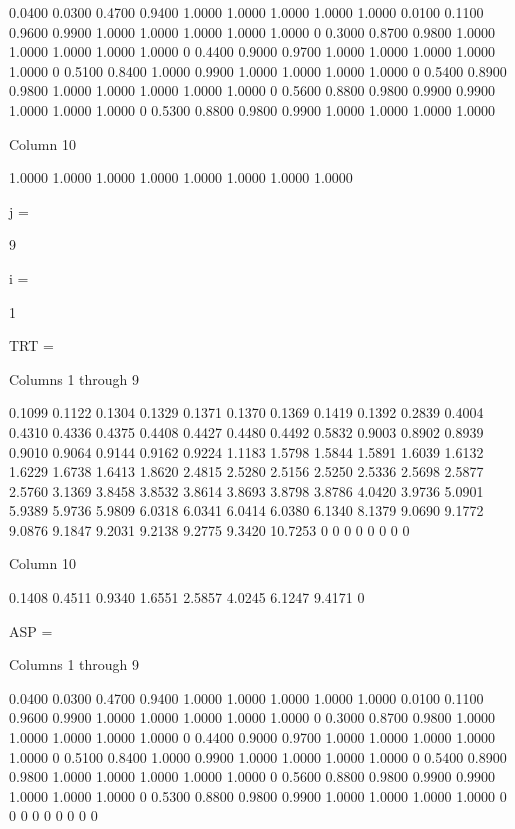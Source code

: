     0.0400    0.0300    0.4700    0.9400    1.0000    1.0000    1.0000    1.0000    1.0000
    0.0100    0.1100    0.9600    0.9900    1.0000    1.0000    1.0000    1.0000    1.0000
         0    0.3000    0.8700    0.9800    1.0000    1.0000    1.0000    1.0000    1.0000
         0    0.4400    0.9000    0.9700    1.0000    1.0000    1.0000    1.0000    1.0000
         0    0.5100    0.8400    1.0000    0.9900    1.0000    1.0000    1.0000    1.0000
         0    0.5400    0.8900    0.9800    1.0000    1.0000    1.0000    1.0000    1.0000
         0    0.5600    0.8800    0.9800    0.9900    0.9900    1.0000    1.0000    1.0000
         0    0.5300    0.8800    0.9800    0.9900    1.0000    1.0000    1.0000    1.0000

  Column 10

    1.0000
    1.0000
    1.0000
    1.0000
    1.0000
    1.0000
    1.0000
    1.0000


j =

     9


i =

     1


TRT =

  Columns 1 through 9

    0.1099    0.1122    0.1304    0.1329    0.1371    0.1370    0.1369    0.1419    0.1392
    0.2839    0.4004    0.4310    0.4336    0.4375    0.4408    0.4427    0.4480    0.4492
    0.5832    0.9003    0.8902    0.8939    0.9010    0.9064    0.9144    0.9162    0.9224
    1.1183    1.5798    1.5844    1.5891    1.6039    1.6132    1.6229    1.6738    1.6413
    1.8620    2.4815    2.5280    2.5156    2.5250    2.5336    2.5698    2.5877    2.5760
    3.1369    3.8458    3.8532    3.8614    3.8693    3.8798    3.8786    4.0420    3.9736
    5.0901    5.9389    5.9736    5.9809    6.0318    6.0341    6.0414    6.0380    6.1340
    8.1379    9.0690    9.1772    9.0876    9.1847    9.2031    9.2138    9.2775    9.3420
   10.7253         0         0         0         0         0         0         0         0

  Column 10

    0.1408
    0.4511
    0.9340
    1.6551
    2.5857
    4.0245
    6.1247
    9.4171
         0


ASP =

  Columns 1 through 9

    0.0400    0.0300    0.4700    0.9400    1.0000    1.0000    1.0000    1.0000    1.0000
    0.0100    0.1100    0.9600    0.9900    1.0000    1.0000    1.0000    1.0000    1.0000
         0    0.3000    0.8700    0.9800    1.0000    1.0000    1.0000    1.0000    1.0000
         0    0.4400    0.9000    0.9700    1.0000    1.0000    1.0000    1.0000    1.0000
         0    0.5100    0.8400    1.0000    0.9900    1.0000    1.0000    1.0000    1.0000
         0    0.5400    0.8900    0.9800    1.0000    1.0000    1.0000    1.0000    1.0000
         0    0.5600    0.8800    0.9800    0.9900    0.9900    1.0000    1.0000    1.0000
         0    0.5300    0.8800    0.9800    0.9900    1.0000    1.0000    1.0000    1.0000
         0         0         0         0         0         0         0         0         0

